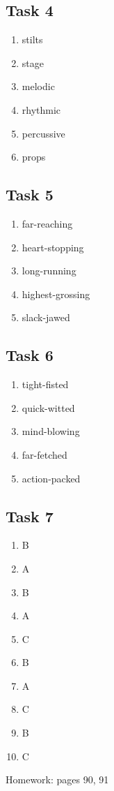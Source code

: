 \documentclass[a4paper]{article}
\begin{document}
\subsection{Task 4}
\begin{enumerate}
    \item stilts
    \item stage
    \item melodic
    \item rhythmic
    \item percussive
    \item props
\end{enumerate}
\subsection{Task 5}
\begin{enumerate}
    \item far-reaching
    \item heart-stopping
    \item long-running
    \item highest-grossing
    \item slack-jawed
\end{enumerate}
\subsection{Task 6}
\begin{enumerate}
    \item tight-fisted
    \item quick-witted
    \item mind-blowing
    \item far-fetched
    \item action-packed
\end{enumerate}
\subsection{Task 7}
\begin{enumerate}
    \item B
    \item A
    \item B
    \item A
    \item C
    \item B
    \item A
    \item C
    \item B
    \item C
\end{enumerate}
\appendix Homework: pages 90, 91
\end{document}
